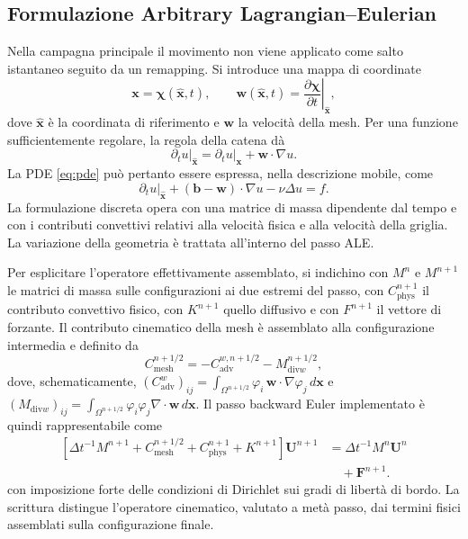 \subsection{Formulazione Arbitrary Lagrangian--Eulerian}

Nella campagna principale il movimento non viene applicato come salto istantaneo seguito da un remapping. Si introduce una mappa di coordinate
\begin{equation}
\bm x=\bm\chi(\widehat{\bm x},t),\qquad
\bm w(\widehat{\bm x},t)=
\left.\frac{\partial\bm\chi}{\partial t}\right|_{\widehat{\bm x}},
\label{eq:ale_map}
\end{equation}
dove $\widehat{\bm x}$ è la coordinata di riferimento e $\bm w$ la velocità della mesh. Per una funzione sufficientemente regolare, la regola della catena dà
\begin{equation}
\left.\partial_tu\right|_{\widehat{\bm x}}
=
\left.\partial_tu\right|_{\bm x}+\bm w\cdot\nabla u.
\label{eq:ale_chain}
\end{equation}
La PDE \eqref{eq:pde} può pertanto essere espressa, nella descrizione mobile, come
\begin{equation}
\left.\partial_tu\right|_{\widehat{\bm x}}
+(\bm b-\bm w)\cdot\nabla u
-\nu\Delta u=f.
\label{eq:ale_strong}
\end{equation}
La formulazione discreta opera con una matrice di massa dipendente dal tempo e con i contributi convettivi relativi alla velocità fisica e alla velocità della griglia. La variazione della geometria è trattata all'interno del passo ALE.

Per esplicitare l'operatore effettivamente assemblato, si indichino con $M^n$ e $M^{n+1}$ le matrici di massa sulle configurazioni ai due estremi del passo, con $C_{\mathrm{phys}}^{n+1}$ il contributo convettivo fisico, con $K^{n+1}$ quello diffusivo e con $F^{n+1}$ il vettore di forzante. Il contributo cinematico della mesh è assemblato alla configurazione intermedia e definito da
\begin{equation}
C_{\mathrm{mesh}}^{n+1/2}
=-C_{\mathrm{adv}}^{w,n+1/2}-M_{\mathrm{div}w}^{n+1/2},
\label{eq:ale_mesh_operator}
\end{equation}
dove, schematicamente, $(C_{\mathrm{adv}}^{w})_{ij}=\int_{\Omega^{n+1/2}}\varphi_i\,\bm w\cdot\nabla\varphi_j\,d\bm x$ e $(M_{\mathrm{div}w})_{ij}=\int_{\Omega^{n+1/2}}\varphi_i\varphi_j\nabla\cdot\bm w\,d\bm x$. Il passo backward Euler implementato è quindi rappresentabile come
\begin{equation}
\begin{aligned}
\left[\Delta t^{-1}M^{n+1}
+C_{\mathrm{mesh}}^{n+1/2}
+C_{\mathrm{phys}}^{n+1}+K^{n+1}\right]\bm U^{n+1}
&=\Delta t^{-1}M^n\bm U^n\\
&\quad+\bm F^{n+1}.
\end{aligned}
\label{eq:ale_discrete_step}
\end{equation}
con imposizione forte delle condizioni di Dirichlet sui gradi di libertà di bordo. La scrittura distingue l'operatore cinematico, valutato a metà passo, dai termini fisici assemblati sulla configurazione finale.

